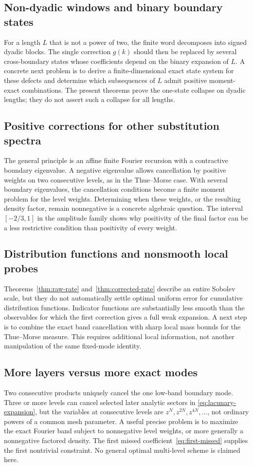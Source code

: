 \documentclass[11pt,a4paper]{article}
\numberwithin{equation}{section}
\theoremstyle{definition}
\theoremstyle{remark}
\begin{document}
\subsection{Non-dyadic windows and binary boundary states}
For a length $L$ that is not a power of two, the finite word decomposes into
signed dyadic blocks. The single correction $g(k)$ should then be replaced by
several cross-boundary states whose coefficients depend on the binary expansion
of $L$. A concrete next problem is to derive a finite-dimensional exact state
system for these defects and determine which subsequences of $L$ admit positive
moment-exact combinations. The present theorems prove the one-state collapse
on dyadic lengths; they do not assert such a collapse for all lengths.

\subsection{Positive corrections for other substitution spectra}
The general principle is an affine finite Fourier recursion with a contractive
boundary eigenvalue. A negative eigenvalue allows cancellation by positive
weights on two consecutive levels, as in the Thue--Morse case. With several
boundary eigenvalues, the cancellation conditions become a finite moment problem
for the level weights. Determining when these weights, or the resulting density
factor, remain nonnegative is a concrete algebraic question. The interval
$[-2/3,1]$ in the amplitude family shows why positivity of the final factor can
be a less restrictive condition than positivity of every weight.

\subsection{Distribution functions and nonsmooth local probes}
Theorems~\ref{thm:raw-rate} and~\ref{thm:corrected-rate} describe an entire
Sobolev scale, but they do not automatically settle optimal uniform error for
cumulative distribution functions. Indicator functions are substantially less
smooth than the observables for which the first correction gives a full weak
expansion. A next step is to combine the exact band cancellation with sharp
local mass bounds for the Thue--Morse measure. This requires additional local
information, not another manipulation of the same fixed-mode identity.

\subsection{More layers versus more exact modes}
Two consecutive products uniquely cancel the one low-band boundary mode.
Three or more levels can cancel selected later analytic sectors in
\eqref{eq:lacunary-expansion}, but the variables at consecutive levels are
$z^N,z^{2N},z^{4N},\ldots$, not ordinary powers of a common mesh parameter.
A useful precise problem is to maximize the exact Fourier band subject to
nonnegative level weights, or more generally a nonnegative factored density.
The first missed coefficient~\eqref{eq:first-missed} supplies the first
nontrivial constraint. No general optimal multi-level scheme is claimed here.
\end{document}
